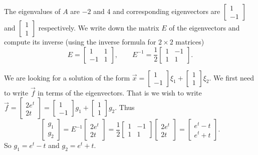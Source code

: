 \begin{exampleSol}
The eigenvalues of $A$ are $-2$ and 4 and corresponding eigenvectors
are
$\left[ \begin{smallmatrix}
1 \\
-1
\end{smallmatrix} \right]$ and
$\left[ \begin{smallmatrix}
1 \\
1
\end{smallmatrix} \right]$ respectively. We write down the matrix $E$ of the eigenvectors and compute its
inverse (using the inverse formula for $2 \times 2$ matrices)
\begin{equation*}
E = \begin{bmatrix}
1 & 1 \\
-1 & 1
\end{bmatrix} ,
\qquad
E^{-1}
=
\frac{1}{2}
\begin{bmatrix}
1 & -1 \\
1 & 1
\end{bmatrix} .
\end{equation*}

We are looking for a solution of the form $\vec{x} = 
\left[ \begin{smallmatrix}
1 \\
-1
\end{smallmatrix} \right] \xi_1 +
\left[ \begin{smallmatrix}
1 \\
1
\end{smallmatrix} \right] \xi_2$.  We first need to write $\vec{f}$
in terms of the eigenvectors.
That is we wish to write $\vec{f} = 
\left[ \begin{smallmatrix}
2e^t \\
2t
\end{smallmatrix} \right] = 
\left[ \begin{smallmatrix}
1 \\
-1
\end{smallmatrix} \right] g_1 +
\left[ \begin{smallmatrix}
1 \\
1
\end{smallmatrix} \right] g_2$.  Thus
\begin{equation*}
\begin{bmatrix}
g_1 \\
g_2
\end{bmatrix} = 
E^{-1}
\begin{bmatrix}
2e^t \\
2t
\end{bmatrix}
=
\frac{1}{2}
\begin{bmatrix}
1 & -1 \\
1 & 1
\end{bmatrix}
\begin{bmatrix}
2e^t \\
2t
\end{bmatrix}
=
\begin{bmatrix}
e^t-t \\
e^t+t
\end{bmatrix} .
\end{equation*}
So $g_1 = e^t-t$ and $g_2 = e^t+t$.


\end{exampleSol}
